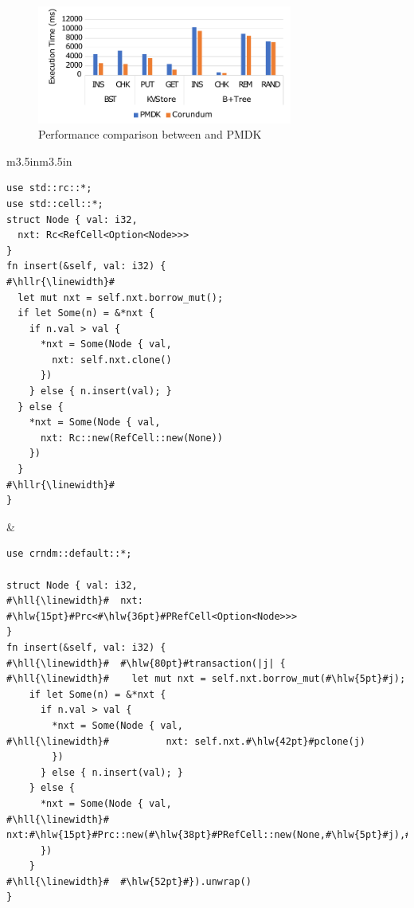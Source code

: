 \documentclass[pageno]{jpaper}
\theoremstyle{invar}
\theoremstyle{goal}
\newcommand{\hllr}[1]{\makebox[0pt][l]{\color{red!15}\rule[-3pt]{#1}{10pt}}}
\newcommand{\hll}[1]{\makebox[0pt][l]{\color{green!15}\rule[-3pt]{#1}{10pt}}}
\newcommand{\hlw}[1]{\makebox[0pt][l]{\color{green!35}\rule[-3pt]{#1}{10pt}}}
\begin{document}

% 

\begin{figure}[!ht]
  \begin{center}
  \includegraphics[width=3.3in]{Graphs/perf-ext.pdf}
  \end{center}
  \vspace*{-\baselineskip}
  \caption{\label{fig:perf} Performance comparison between \this{} and PMDK}
\end{figure}

\begin{table}[!ht]
  \center
  \small
  \begin{tabular}{m{3.5in}m{3.5in}}
    \begin{lstlisting}[escapechar=\#]
use std::rc::*;
use std::cell::*;
struct Node { val: i32,
  nxt: Rc<RefCell<Option<Node>>>
}
fn insert(&self, val: i32) {
#\hllr{\linewidth}#
  let mut nxt = self.nxt.borrow_mut();
  if let Some(n) = &*nxt {
    if n.val > val {
      *nxt = Some(Node { val,
        nxt: self.nxt.clone()
      })
    } else { n.insert(val); }
  } else {
    *nxt = Some(Node { val,
      nxt: Rc::new(RefCell::new(None))
    })
  }
#\hllr{\linewidth}#
}\end{lstlisting}
    &
      \begin{lstlisting}[escapechar=\#]
use crndm::default::*;

struct Node { val: i32,
#\hll{\linewidth}#  nxt: #\hlw{15pt}#Prc<#\hlw{36pt}#PRefCell<Option<Node>>>
}
fn insert(&self, val: i32) {
#\hll{\linewidth}#  #\hlw{80pt}#transaction(|j| {
#\hll{\linewidth}#    let mut nxt = self.nxt.borrow_mut(#\hlw{5pt}#j);
    if let Some(n) = &*nxt {
      if n.val > val {
        *nxt = Some(Node { val,
#\hll{\linewidth}#          nxt: self.nxt.#\hlw{42pt}#pclone(j)
        })
      } else { n.insert(val); }
    } else {
      *nxt = Some(Node { val,
#\hll{\linewidth}#        nxt:#\hlw{15pt}#Prc::new(#\hlw{38pt}#PRefCell::new(None,#\hlw{5pt}#j),#\hlw{5pt}#j)
      })
    }
#\hll{\linewidth}#  #\hlw{52pt}#}).unwrap()
}\end{lstlisting}
  \end{tabular} 
  \vspace*{-\baselineskip}
  \caption{Comparing the implementation of insert operation in Rust and \This}
  \label{tbl:example}
\end{table}
\vspace*{-\baselineskip}
\end{document}
